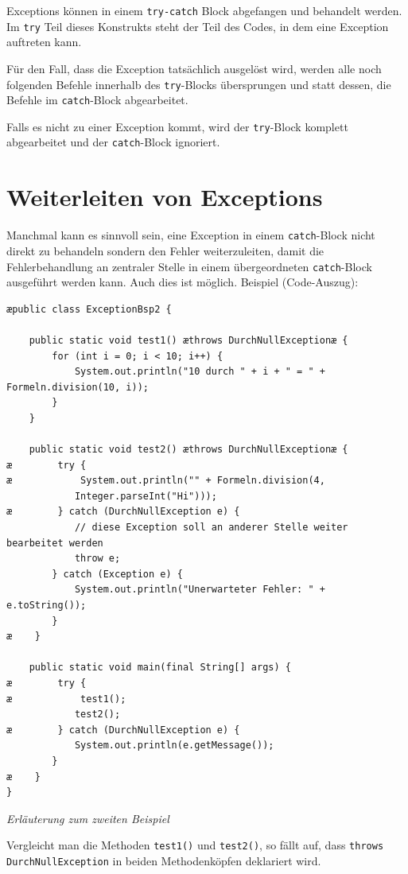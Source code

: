 \begin{compactenum}[a)]
Exceptions können in einem \lstinline|try-catch| Block abgefangen und behandelt
werden. Im \lstinline|try| Teil dieses Konstrukts steht der Teil des Codes, in
dem eine Exception auftreten kann.

Für den Fall, dass die Exception tatsächlich ausgelöst wird, werden alle
noch folgenden Befehle innerhalb des \lstinline|try|-Blocks übersprungen und
statt dessen, die Befehle im \lstinline|catch|-Block abgearbeitet.

Falls es nicht zu einer Exception kommt, wird der \lstinline|try|-Block komplett
abgearbeitet und der \lstinline|catch|-Block ignoriert.
\end{compactenum}


\section{Weiterleiten von Exceptions}

Manchmal kann es sinnvoll sein, eine Exception in einem \lstinline|catch|-Block
nicht direkt zu behandeln sondern den Fehler weiterzuleiten, damit die
Fehlerbehandlung an zentraler Stelle in einem übergeordneten
\lstinline|catch|-Block ausgeführt werden kann. Auch dies ist möglich. Beispiel
(Code-Auszug):

\begin{lstlisting}
æpublic class ExceptionBsp2 {

    public static void test1() æthrows DurchNullExceptionæ {
        for (int i = 0; i < 10; i++) {
            System.out.println("10 durch " + i + " = " + Formeln.division(10, i));
        }
    }

    public static void test2() æthrows DurchNullExceptionæ {
æ        try {
æ            System.out.println("" + Formeln.division(4,
            Integer.parseInt("Hi"))); 
æ        } catch (DurchNullException e) {
            // diese Exception soll an anderer Stelle weiter bearbeitet werden
            throw e;
        } catch (Exception e) {
            System.out.println("Unerwarteter Fehler: " + e.toString());
        }
æ    }
    
    public static void main(final String[] args) {
æ        try {
æ            test1();
            test2();
æ        } catch (DurchNullException e) {
            System.out.println(e.getMessage());
        }
æ    }
}   
\end{lstlisting}

{\em Erläuterung zum zweiten Beispiel}

Vergleicht man die Methoden \lstinline|test1()| und \lstinline|test2()|, so
fällt auf, dass \lstinline|throws DurchNullException| in beiden Methodenköpfen
deklariert wird.

